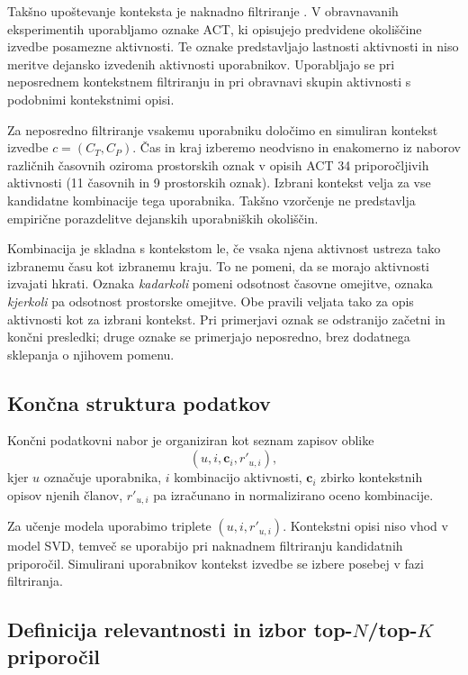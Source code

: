 \documentclass[a4paper,twoside,openright,12pt,slovene]{book}
\begin{document}
Takšno upoštevanje konteksta je naknadno filtriranje
\cite{adomavicius2011context}. V obravnavanih eksperimentih uporabljamo oznake ACT, ki opisujejo
predvidene okoliščine izvedbe posamezne aktivnosti. Te oznake
predstavljajo lastnosti aktivnosti in niso meritve dejansko izvedenih
aktivnosti uporabnikov. Uporabljajo se pri neposrednem kontekstnem
filtriranju in pri obravnavi skupin aktivnosti s podobnimi
kontekstnimi opisi.

Za neposredno filtriranje vsakemu uporabniku določimo en simuliran
kontekst izvedbe $c=(C_T,C_P)$. Čas in kraj izberemo neodvisno
in enakomerno iz naborov različnih časovnih oziroma prostorskih
oznak v opisih ACT 34 priporočljivih aktivnosti
(11 časovnih in 9 prostorskih oznak). Izbrani kontekst velja za vse
kandidatne kombinacije tega uporabnika. Takšno vzorčenje ne
predstavlja empirične porazdelitve dejanskih uporabniških okoliščin.

Kombinacija je skladna s kontekstom le, če vsaka njena aktivnost
ustreza tako izbranemu času kot izbranemu kraju. To ne pomeni,
da se morajo aktivnosti izvajati hkrati. Oznaka \emph{kadarkoli}
pomeni odsotnost časovne omejitve, oznaka \emph{kjerkoli} pa
odsotnost prostorske omejitve. Obe pravili veljata tako za opis
aktivnosti kot za izbrani kontekst. Pri primerjavi oznak se odstranijo
začetni in končni presledki; druge oznake se primerjajo neposredno,
brez dodatnega sklepanja o njihovem pomenu.






\subsection{Končna struktura podatkov}
\label{sec:data_structure}

Končni podatkovni nabor je organiziran kot seznam zapisov oblike
\[
(u,i,\mathbf{c}_i,r'_{u,i}),
\]
kjer $u$ označuje uporabnika, $i$ kombinacijo aktivnosti,
$\mathbf{c}_i$ zbirko kontekstnih opisov njenih članov,
$r'_{u,i}$ pa izračunano in normalizirano oceno kombinacije.

Za učenje modela uporabimo triplete $(u,i,r'_{u,i})$.
Kontekstni opisi niso vhod v model SVD, temveč se uporabijo
pri naknadnem filtriranju kandidatnih priporočil. Simulirani
uporabnikov kontekst izvedbe se izbere posebej v fazi filtriranja.

\subsection{Definicija relevantnosti in izbor top-$N$/top-$K$ priporočil}
\label{sec:relevance_definition}
\end{document}
